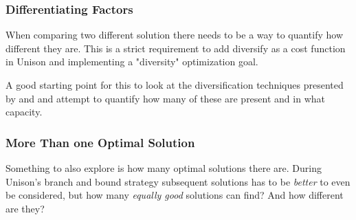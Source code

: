 \subsubsection{Differentiating Factors}

When comparing two different solution there needs to be a way to quantify how different
they are. This is a strict requirement to add diversify as a cost function in Unison and
implementing a "diversity" optimization goal.

A good starting point for this to look at the diversification techniques presented by
\textcite[Section~4.4]{compiler-generated-sw-div} and \textcite{survey} and attempt to
quantify how many of these are present and in what capacity.

\subsubsection{More Than one Optimal Solution}

Something to also explore is how many optimal solutions there are. During Unison's branch
and bound strategy subsequent solutions has to be \textit{better} to even be considered,
but how many \textit{equally good} solutions can find? And how different are they?
